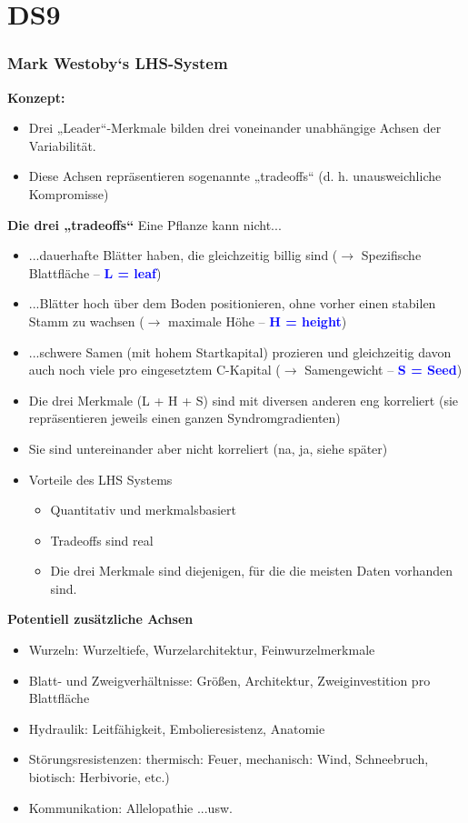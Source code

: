 \section{DS9}
\subsubsection{Mark Westoby‘s LHS-System}
\textbf{Konzept:}
\begin{itemize}
	\item Drei „Leader“-Merkmale bilden drei voneinander unabhängige Achsen der Variabilität.
	\item Diese Achsen repräsentieren sogenannte „tradeoffs“ (d. h. unausweichliche Kompromisse)
\end{itemize}

\textbf{Die drei „tradeoffs“}
Eine Pflanze kann nicht...
\begin{itemize}
	\item ...dauerhafte Blätter haben, die gleichzeitig billig sind ($\rightarrow$ Spezifische Blattfläche – \textcolor{blue}{\textbf{L = leaf}})
	\item ...Blätter hoch über dem Boden positionieren, ohne vorher einen stabilen Stamm zu wachsen ($\rightarrow$ maximale Höhe – \textcolor{blue}{\textbf{H = height}})
	\item ...schwere Samen (mit hohem Startkapital) prozieren und gleichzeitig davon auch noch viele pro eingesetztem C-Kapital ($\rightarrow$ Samengewicht – \textcolor{blue}{\textbf{S = Seed}})
	\item Die drei Merkmale (L + H + S) sind mit diversen anderen eng korreliert (sie repräsentieren jeweils einen ganzen Syndromgradienten)
	\item Sie sind untereinander aber nicht korreliert (na, ja, siehe später)
	\item Vorteile des LHS Systems
	\begin{itemize}
		\item Quantitativ und merkmalsbasiert
		\item Tradeoffs sind real
		\item Die drei Merkmale sind diejenigen, für die die meisten Daten vorhanden sind.
	\end{itemize}
\end{itemize}

\textbf{Potentiell zusätzliche Achsen}
\begin{itemize}
	\item Wurzeln: Wurzeltiefe, Wurzelarchitektur, Feinwurzelmerkmale
	\item Blatt- und Zweigverhältnisse: Größen, Architektur, Zweiginvestition pro Blattfläche
	\item Hydraulik: Leitfähigkeit, Embolieresistenz, Anatomie
	\item Störungsresistenzen: thermisch: Feuer, mechanisch: Wind, Schneebruch, biotisch: Herbivorie, etc.)
	\item Kommunikation: Allelopathie ...usw.
\end{itemize}


